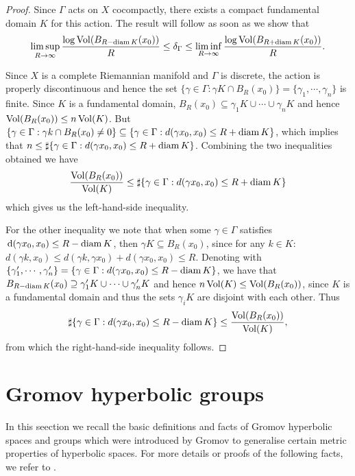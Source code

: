 \documentclass{report}
\begin{document}
\begin{proof}
    Since $\Gamma$ acts on $X$ cocompactly, there exists a compact fundamental domain $K$ for this action.
    The result will follow as soon as we show that 
    \begin{align*}
        \limsup_{R \to \infty} \frac{\log \operatorname{Vol}(B_{R-\operatorname{diam} K}(x_0))}{R} \leq \delta_\Gamma \leq
        \liminf_{R \to \infty} \frac{\log \operatorname{Vol}(B_{R + \operatorname{diam} K}(x_0))}{R}.
    \end{align*}

    Since $X$ is a complete Riemannian manifold and $\Gamma$ is discrete, the action is properly discontinuous and hence the set $\{\gamma \in \Gamma : \gamma K \cap B_R(x_0)\} = \{ \gamma_1, \cdots, \gamma_n\}$ is finite.
    Since $K$ is a fundamental domain, $B_R(x_0) \subseteq \gamma_1 K \cup \cdots \cup \gamma_n K$ and hence $\operatorname{Vol}(B_R(x_0)) \leq n  \operatorname{Vol}(K)$.
    But $ \{\gamma \in \Gamma: \gamma k \cap B_R(x_0) \neq 0 \} \subseteq \{ \gamma \in \Gamma : d(\gamma x_0 , x_0) \leq R + \operatorname{diam} K \}$, which implies that $n \leq \sharp \{ \gamma \in \Gamma : d(\gamma x_0, x_0) \leq R + \operatorname{diam} K \}$.
    Combining the two inequalities obtained we have
    \begin{equation*}
        \frac{\operatorname{Vol}(B_R(x_0))}{\operatorname{Vol}(K)} \leq \sharp \{\gamma \in \Gamma : d(\gamma x_0, x_0) \leq R+ \operatorname{diam} K\}
    \end{equation*}
    which gives us the left-hand-side inequality.

    For the other inequality we note that when some $\gamma \in \Gamma$ satisfies $\,\mathrm{d}(\gamma x_0, x_0) \leq R - \operatorname{diam} K$, then $\gamma K \subseteq B_R(x_0)$, since for any $k \in K$:
    $d(\gamma k, x_0) \leq d(\gamma k, \gamma x_0) + d(\gamma x_0, x_0) \leq R$.
    Denoting with $\{ \gamma_1', \cdots, \gamma_n' \} = \{ \gamma \in \Gamma : d(\gamma x_0, x_0) \leq R - \operatorname{diam} K \}$, we have that $B_{R-\operatorname{diam} K}(x_0) \supseteq \gamma_1' K \cup \cdots \cup \gamma_n' K$ and hence $n \operatorname{Vol}(K) \leq \operatorname{Vol}(B_R(x_0))$, since $K$ is a fundamental domain and thus the sets $\gamma_i K$ are disjoint with each other.
    Thus
    \[
    \sharp \{ \gamma \in \Gamma : d(\gamma x_0, x_0) \leq R - \operatorname{diam} K \} \leq \frac{\operatorname{Vol}(B_R(x_0))}{\operatorname{Vol}(K)},
    \]
    from which the right-hand-side inequality follows.
\end{proof}

\section{Gromov hyperbolic groups}
In this seection we recall the basic definitions and facts of Gromov hyperbolic spaces and groups which were introduced by Gromov to generalise certain metric properties of hyperbolic spaces.
For more details or proofs of the following facts, we refer to \cite{ghys2013groupes}.
\end{document}
